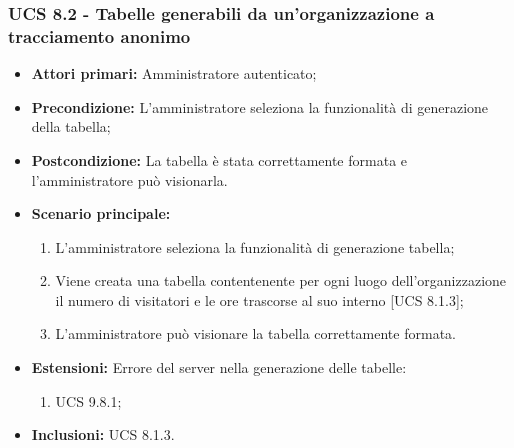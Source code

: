 \subsubsection{UCS 8.2 - Tabelle generabili da  un'organizzazione a tracciamento anonimo}%
\begin{itemize}
\item \textbf{Attori primari:} Amministratore autenticato;
\item \textbf{Precondizione:} L'amministratore seleziona la funzionalità di generazione della tabella;
\item \textbf{Postcondizione:} La tabella è stata correttamente formata e l'amministratore può visionarla.
\item \textbf{Scenario principale:}
	\begin{enumerate}%
	\item L'amministratore seleziona la funzionalità di generazione tabella;
	\item Viene creata una tabella contentenente per ogni luogo dell'organizzazione il numero di visitatori e le ore trascorse al suo interno [UCS 8.1.3];
	\item L'amministratore può visionare la tabella correttamente formata.
\end{enumerate}
\item \textbf{Estensioni: }Errore del server nella generazione delle tabelle:
	\begin{enumerate}
		\item UCS 9.8.1;
	\end{enumerate}
\item \textbf{Inclusioni:} UCS 8.1.3.
\end{itemize}

